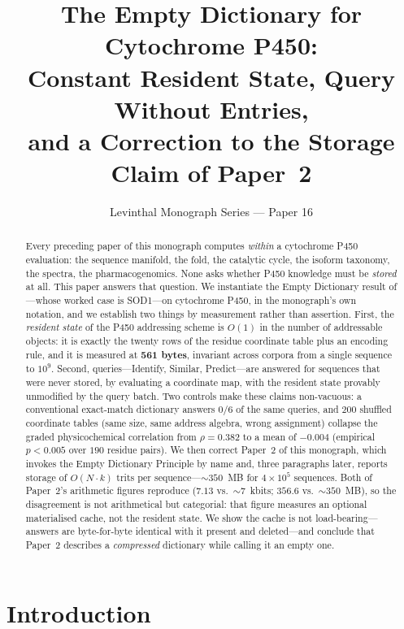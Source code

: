 \documentclass[11pt,twocolumn,a4paper]{article}
\title{\textbf{The Empty Dictionary for Cytochrome P450:\\
Constant Resident State, Query Without Entries,\\
and a Correction to the Storage Claim of Paper~2}}
\author{Levinthal Monograph Series --- Paper 16}
\date{}
\theoremstyle{plain}
\theoremstyle{definition}
\theoremstyle{remark}
\begin{document}
\maketitle

\begin{abstract}
Every preceding paper of this monograph computes \emph{within} a cytochrome
P450 evaluation: the sequence manifold, the fold, the catalytic cycle, the
isoform taxonomy, the spectra, the pharmacogenomics. None asks whether P450
knowledge must be \emph{stored} at all. This paper answers that question.
We instantiate the Empty Dictionary result of \citet{sachikonye2025c}---whose
worked case is SOD1---on cytochrome P450, in the monograph's own notation,
and we establish two things by measurement rather than assertion. First, the
\emph{resident state} of the P450 addressing scheme is $O(1)$ in the number
of addressable objects: it is exactly the twenty rows of the residue
coordinate table plus an encoding rule, and it is measured at \textbf{561
bytes}, invariant across corpora from a single sequence to $10^{9}$. Second,
queries---Identify, Similar, Predict---are answered for sequences that were
never stored, by evaluating a coordinate map, with the resident state
provably unmodified by the query batch. Two controls make these claims
non-vacuous: a conventional exact-match dictionary answers $0/6$ of the same
queries, and $200$ shuffled coordinate tables (same size, same address
algebra, wrong assignment) collapse the graded physicochemical correlation
from $\rho = 0.382$ to a mean of $-0.004$ (empirical $p < 0.005$ over $190$
residue pairs). We then correct Paper~2 of this monograph, which invokes the
Empty Dictionary Principle by name and, three paragraphs later, reports
storage of $O(N \cdot k)$ trits per sequence---${\sim}350$~MB for
$4 \times 10^{5}$ sequences. Both of Paper~2's arithmetic figures reproduce
($7.13$ vs.\ ${\sim}7$~kbits; $356.6$ vs.\ ${\sim}350$~MB), so the
disagreement is not arithmetical but categorial: that figure measures an
optional materialised cache, not the resident state. We show the cache is not
load-bearing---answers are byte-for-byte identical with it present and
deleted---and conclude that Paper~2 describes a \emph{compressed} dictionary
while calling it an empty one.
\end{abstract}

\tableofcontents
\newpage

\section{Introduction}
\end{document}
